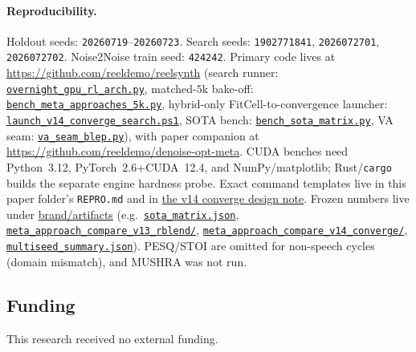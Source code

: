 \paragraph{Reproducibility.}
Holdout seeds: \texttt{20260719}--\texttt{20260723}.
Search seeds: \texttt{1902771841}, \texttt{2026072701}, \texttt{2026072702}.
Noise2Noise train seed: \texttt{424242}.
Primary code lives at \url{https://github.com/reeldemo/reelsynth}
(search runner:
\href{https://github.com/reeldemo/reelsynth/blob/main/scripts/overnight_gpu_rl_arch.py}{\texttt{overnight\_gpu\_rl\_arch.py}},
matched-$5$k bake-off:
\href{https://github.com/reeldemo/reelsynth/blob/main/scripts/bench_meta_approaches_5k.py}{\texttt{bench\_meta\_approaches\_5k.py}},
hybrid-only FitCell-to-convergence launcher:
\href{https://github.com/reeldemo/reelsynth/blob/main/scripts/launch_v14_converge_search.ps1}{\texttt{launch\_v14\_converge\_search.ps1}},
SOTA bench:
\href{https://github.com/reeldemo/reelsynth/blob/main/scripts/bench_sota_matrix.py}{\texttt{bench\_sota\_matrix.py}},
VA seam:
\href{https://github.com/reeldemo/reelsynth/blob/main/scripts/baselines/va_seam_blep.py}{\texttt{va\_seam\_blep.py}}),
with paper companion at \url{https://github.com/reeldemo/denoise-opt-meta}.
CUDA benches need Python~3.12, PyTorch~$2.6$+CUDA~12.4, and NumPy/matplotlib; Rust/\texttt{cargo} builds the separate engine hardness probe.
Exact command templates live in this paper folder's \texttt{REPRO.md} and in
\href{https://github.com/reeldemo/reelsynth/blob/main/docs/superpowers/specs/2026-07-31-fitcell-converge-meta-search-design.md}{the v14 converge design note}.
Frozen numbers live under
\href{https://github.com/reeldemo/reelsynth/tree/main/brand/artifacts}{brand/artifacts}
(e.g.\
\href{https://github.com/reeldemo/reelsynth/blob/main/brand/artifacts/sota_matrix.json}{\texttt{sota\_matrix.json}},
\href{https://github.com/reeldemo/reelsynth/tree/main/brand/artifacts/meta_approach_compare_v13_rblend}{\texttt{meta\_approach\_compare\_v13\_rblend/}},
\href{https://github.com/reeldemo/reelsynth/tree/main/brand/artifacts/meta_approach_compare_v14_converge}{\texttt{meta\_approach\_compare\_v14\_converge/}},
\href{https://github.com/reeldemo/reelsynth/blob/main/brand/artifacts/holdout_multiseed_v13/multiseed_summary.json}{\texttt{multiseed\_summary.json}}).
PESQ/STOI are omitted for non-speech cycles (domain mismatch), and MUSHRA was not run.

\subsection{Funding}
\label{sec:funding}
This research received no external funding.


